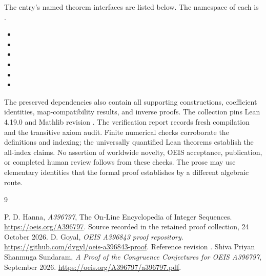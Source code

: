 \documentclass[11pt,a4paper]{article}
\theoremstyle{remark}\newtheorem{remark}[theorem]{Remark}
\begin{document}
The entry's named theorem interfaces are listed below. The namespace of
each is .
\begin{itemize}[leftmargin=1.5em,itemsep=1pt]
\item {}
\item {}
\item {}
\item {}
\item {}
\item {}
\end{itemize}
The preserved dependencies also contain all supporting constructions,
coefficient identities, map-compatibility results, and inverse proofs.
The collection pins Lean 4.19.0 and Mathlib revision
.
The verification report records fresh compilation and the transitive axiom
audit. Finite numerical checks corroborate the definitions and indexing;
the universally quantified Lean theorems establish the all-index claims.
No assertion of worldwide novelty, OEIS acceptance, publication, or completed
human review follows from these checks. The prose may use elementary
identities that the formal proof establishes by a different algebraic route.

\begin{thebibliography}{9}\raggedright
{} P. D. Hanna, \emph{A396797}, The On-Line Encyclopedia of Integer
Sequences. \url{https://oeis.org/A396797}. Source recorded in the retained
proof collection, 24 October 2026.
 D. Goyal, \emph{OEIS A396843 proof repository}.
\url{https://github.com/dvgyl/oeis-a396843-proof}.
Reference revision .
 Shiva Priyan Shanmuga Sundaram,
\emph{A Proof of the Congruence Conjectures for OEIS A396797}, September 2026.
\url{https://oeis.org/A396797/a396797.pdf}.
\end{thebibliography}
\end{document}
